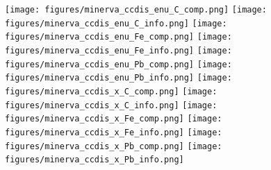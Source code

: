 \documentclass{article}
\begin{document}
\centering
\texttt{[image: figures/minerva\_ccdis\_enu\_C\_comp.png]}
\texttt{[image: figures/minerva\_ccdis\_enu\_C\_info.png]}
\centering
\texttt{[image: figures/minerva\_ccdis\_enu\_Fe\_comp.png]}
\texttt{[image: figures/minerva\_ccdis\_enu\_Fe\_info.png]}
\centering
\texttt{[image: figures/minerva\_ccdis\_enu\_Pb\_comp.png]}
\texttt{[image: figures/minerva\_ccdis\_enu\_Pb\_info.png]}
\centering
\texttt{[image: figures/minerva\_ccdis\_x\_C\_comp.png]}
\texttt{[image: figures/minerva\_ccdis\_x\_C\_info.png]}
\centering
\texttt{[image: figures/minerva\_ccdis\_x\_Fe\_comp.png]}
\texttt{[image: figures/minerva\_ccdis\_x\_Fe\_info.png]}
\centering
\texttt{[image: figures/minerva\_ccdis\_x\_Pb\_comp.png]}
\texttt{[image: figures/minerva\_ccdis\_x\_Pb\_info.png]}
\end{document}
